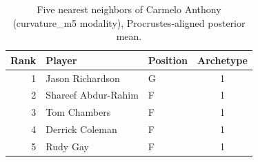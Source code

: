 \begin{table}[htbp]
  \centering\small
  \begin{tabular}{rllc}
    \toprule
    Rank & Player & Position & Archetype \\
    \midrule
    1 & Jason Richardson & G & 1 \\
    2 & Shareef Abdur-Rahim & F & 1 \\
    3 & Tom Chambers & F & 1 \\
    4 & Derrick Coleman & F & 1 \\
    5 & Rudy Gay & F & 1 \\
    \bottomrule
  \end{tabular}
  \caption{Five nearest neighbors of Carmelo Anthony (curvature_m5 modality), Procrustes-aligned posterior mean.}
  \label{tab:Carmelo_Anthony_neighbors_curvature_m5}
\end{table}

